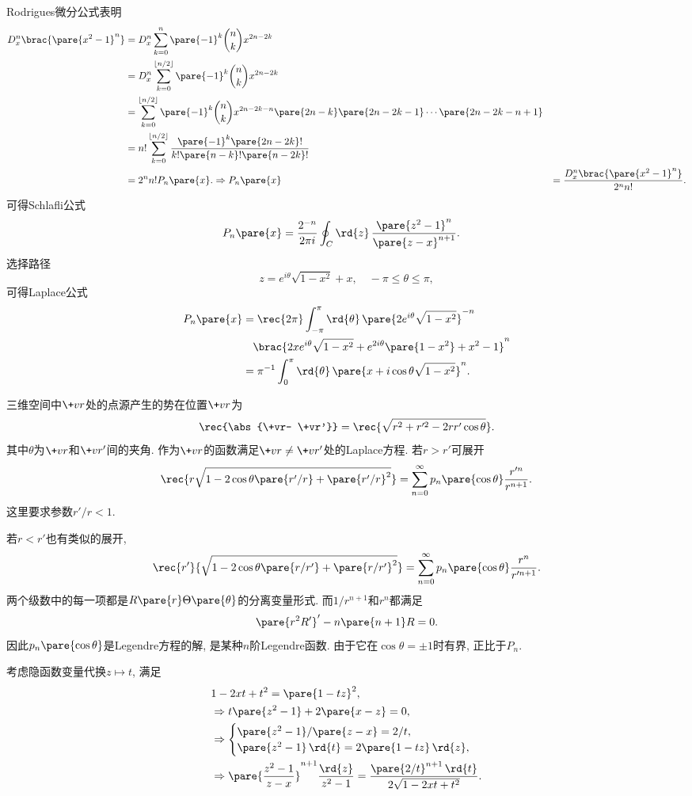 \documentclass[hidelinks]{ctexart}
\begin{document}
Rodrigues微分公式表明
\begin{align*}
    D_x^n\brac{\pare{x^2 - 1}^n} &= D_x^n \sum_{k=0}^n \pare{-1}^k \binom{n}{k} x^{2n-2k} \\
    &= D_x^n \sum_{k=0}^{\lfloor n/2\rfloor} \pare{-1}^k \binom{n}{k} x^{2n-2k} \\
    &= \sum_{k=0}^{\lfloor n/2 \rfloor} \pare{-1}^k \binom{n}{k} x^{2n-2k-n}\pare{2n-k}\pare{2n-2k-1}\cdots\pare{2n-2k-n+1} \\
    &= n!\sum_{k=0}^{\lfloor n/2 \rfloor} \frac{\pare{-1}^k \pare{2n-2k}!}{k!\pare{n-k}!\pare{n-2k}!}\\
    &= 2^n n!P_n\pare{x}.
    \Rightarrow P_n\pare{x} &= \frac{D_x^n\brac{\pare{x^2-1}^n}}{2^n n!}.
\end{align*}
可得Schlafli公式
\begin{align*}
    P_n\pare{x} &= \frac{2^{-n}}{2\pi i}\oint_C \rd{z}\, \frac{\pare{z^2 - 1}^n}{\pare{z-x}^{n+1}}.
\end{align*}
选择路径
\[ z = e^{i\theta}\sqrt{1-x^2} + x,\quad -\pi\le \theta \le \pi, \]
可得Laplace公式
\begin{align*}
    P_n\pare{x} &= \rec{2\pi}\int_{-\pi}^\pi \rd{\theta}\,\pare{2e^{i\theta}\sqrt{1-x^2}}^{-n} \\
    &\phantom{=\,} \brac{2x e^{i\theta} \sqrt{1-x^2} + e^{2i\theta}\pare{1-x^2} + x^2 -1}^{n}\\
    &= \pi^{-1} \int_0^\pi \rd{\theta}\,\pare{x+i\cos\theta \sqrt{1-x^2}}^n.
\end{align*}
\par
三维空间中$\+vr$处的点源产生的势在位置$\+vr$为
\[ \rec{\abs{\+vr- \+vr'}} = \rec{\sqrt{r^2 + r'^2 - 2rr'\cos\theta}}. \]
其中$\theta$为$\+vr$和$\+vr'$间的夹角. 作为$\+vr$的函数满足$\+vr\neq \+vr'$处的Laplace方程. 若$r>r'$可展开
\[ \rec{r\sqrt{1-2\cos\theta\pare{r'/r} + \pare{r'/r}^2}} = \sum_{n=0}^\infty p_n\pare{\cos\theta}\frac{r'^n}{r^{n+1}}. \]
这里要求参数$r'/r<1$.
\par
若$r<r'$也有类似的展开,
\[ \rec{r'}{\sqrt{1-2\cos\theta\pare{r/r'}+\pare{r/r'}^2}} = \sum_{n=0}^\infty p_n\pare{\cos\theta} \frac{r^n}{r'^{n+1}}. \]
两个级数中的每一项都是$R\pare{r}\Theta\pare{\theta}$的分离变量形式. 而$1/r^{n+1}$和$r^n$都满足
\[ \pare{r^2R'}' - n\pare{n+1}R = 0. \]
因此$p_n\pare{\cos\theta}$是Legendre方程的解, 是某种$n$阶Legendre函数. 由于它在$\cos\theta = \pm 1$时有界, 正比于$P_n$.
\par
考虑隐函数变量代换$z\mapsto t$, 满足
\begin{align*}
    & 1-2xt + t^2 = \pare{1-tz}^2, \\
    & \Rightarrow t\pare{z^2 - 1}+ 2\pare{x-z} = 0, \\
    & \Rightarrow \begin{cases}
        \pare{z^2-1}/\pare{z-x} = 2/t,\\
        \pare{z^2-1}\,\rd{t} = 2\pare{1-tz}\,\rd{z},
    \end{cases}\\
    & \Rightarrow \pare{\frac{z^2-1}{z-x}}^{n+1} \frac{\rd{z}}{z^2-1} = \frac{\pare{2/t}^{n+1}\,\rd{t}}{2\sqrt{1-2xt+t^2}}.
\end{align*}
\end{document}
